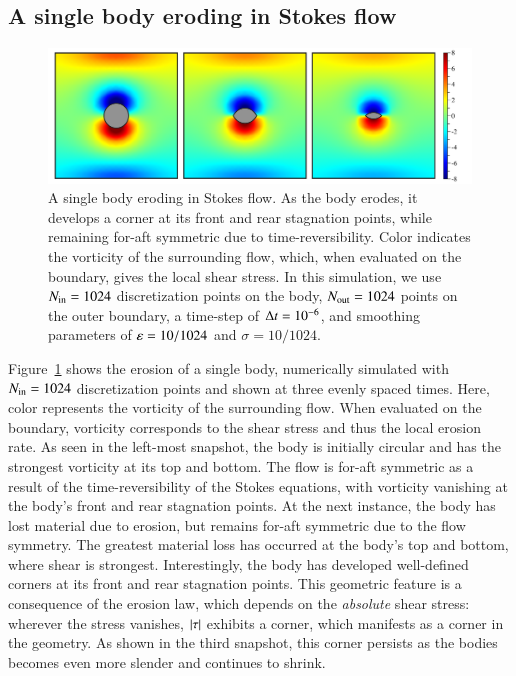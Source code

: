 \documentclass[preprint, 10pt]{elsarticle}
\begin{document}
\subsection{A single body eroding in Stokes flow}

\begin{figure}%
\begin{center}
\includegraphics[width = 0.80 \textwidth]{./figs/01bodseq.pdf}
\caption{A single body eroding in Stokes flow. As the body erodes, it develops a corner at its front and rear stagnation points, while remaining for-aft symmetric due to time-reversibility. Color indicates the vorticity of the surrounding flow, which, when evaluated on the boundary, gives the local shear stress. In this simulation, we use $N_{\mathrm{in}} = 1024$ discretization points on the body, $N_{\mathrm{out}} = 1024$ points on the outer boundary, a time-step of $\Delta t = 10^{-6}$, and smoothing parameters of $\varepsilon = 10/1024$ and $\sigma = 10/1024$.}
\label{01bodseq} 
\end{center}
\end{figure}

Figure~\ref{01bodseq} shows the erosion of a single body, numerically simulated with $N_{\mathrm{in}} = 1024$ discretization points and shown at three evenly spaced times. Here, color represents the vorticity of the surrounding flow. When evaluated on the boundary, vorticity corresponds to the shear stress and thus the local erosion rate. As seen in the left-most snapshot, the body is initially circular and has the strongest vorticity at its top and bottom. The flow is for-aft symmetric as a result of the time-reversibility of the Stokes equations, with vorticity vanishing at the body's front and rear stagnation points. At the next instance, the body has lost material due to erosion, but remains for-aft symmetric due to the flow symmetry. The greatest material loss has occurred at the body's top and bottom, where shear is strongest. Interestingly, the body has developed well-defined corners at its front and rear stagnation points. This geometric feature is a consequence of the erosion law, which depends on the {\em absolute} shear stress: wherever the stress vanishes, $\lvert \tau \rvert$ exhibits a corner, which manifests as a corner in the geometry. As shown in the third snapshot, this corner persists as the bodies becomes even more slender and continues to shrink.  
\end{document}
